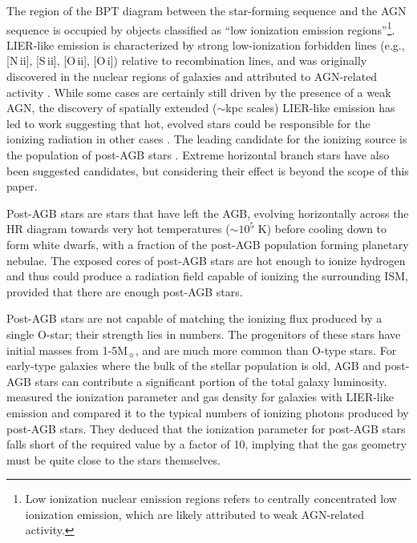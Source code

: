 \documentclass[linenumbers, trackchanges, tighten]{aastex61}%
\newcommand{\nii}{[N\,{\sc ii}]\xspace}
\newcommand{\sii}{[S\,{\sc ii}]\xspace}
\newcommand{\oii}{[O\,{\sc ii}]\xspace}
\newcommand{\oi}{[O\,{\sc i}]\xspace}
\newcommand\Msun{\ensuremath{\mathrm{M_{\sun}}}}
\begin{document}
The region of the BPT diagram between the star-forming sequence and the AGN sequence is occupied by objects classified as ``low ionization emission regions''\citep[LIERs, ][]{Belfiore16}\footnote{Low ionization nuclear emission regions \citep[LINERs, ][]{Heckman1980} refers to centrally concentrated low ionization emission, which are likely attributed to weak AGN-related activity.}. LIER-like emission is characterized by strong low-ionization forbidden lines (e.g., \nii{}, \sii{}, \oii{}, \oi{}) relative to recombination lines, and was originally discovered in the nuclear regions of galaxies and attributed to AGN-related activity \citep{Kauffmann03b, Kewley06, Ho08}. While some cases are certainly still driven by the presence of a weak AGN, the discovery of spatially extended (${\sim}$kpc scales) LIER-like emission has led to work suggesting that hot, evolved stars could be responsible for the ionizing radiation in other cases \citep{Singh13, Belfiore16}. The leading candidate for the ionizing source is the population of post-AGB stars \citep{Binette94, Sarzi10, Yan12}. Extreme horizontal branch stars have also been suggested candidates, but considering their effect is beyond the scope of this paper.

Post-AGB stars are stars that have left the AGB, evolving horizontally across the HR diagram towards very hot temperatures ($\sim10^5$ K) before cooling down to form white dwarfs, with a fraction of the post-AGB population forming planetary nebulae. The exposed cores of post-AGB stars are hot enough to ionize hydrogen and thus could produce a radiation field capable of ionizing the surrounding ISM, provided that there are enough post-AGB stars. 

Post-AGB stars are not capable of matching the ionizing flux produced by a single O-star; their strength lies in numbers. The progenitors of these stars have initial masses from 1-5\Msun{}, and are much more common than O-type stars. For early-type galaxies where the bulk of the stellar population is old, AGB and post-AGB stars can contribute a significant portion of the total galaxy luminosity. \citet{Yan12} measured the ionization parameter and gas density for galaxies with LIER-like emission and compared it to the typical numbers of ionizing photons produced by post-AGB stars. They deduced that the ionization parameter for post-AGB stars falls short of the required value by a factor of 10, implying that the gas geometry must be quite close to the stars themselves.
\end{document}
